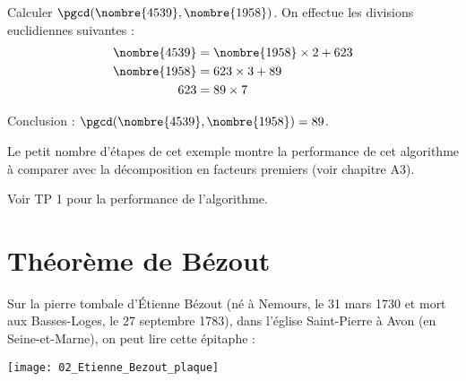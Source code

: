 \begin{methode*1}
\exercice
\label{methode-alg_euclide}
Calculer $\pgcd(\nombre{4539},\nombre{1958})$.
\correction
On effectue les divisions euclidiennes suivantes :\vspace{-5pt}
$$\begin{aligned}
\nombre{4539}&=\nombre{1958}\times2+623\\
\nombre{1958}&=623\times3+89\\
623&=89\times7
\end{aligned}\vspace{-5pt}$$

Conclusion : $\pgcd(\nombre{4539},\nombre{1958})=89$.
\end{methode*1}

\begin{remarque}
Le petit nombre d'étapes de cet exemple montre la performance de cet algorithme à comparer avec la décomposition en facteurs premiers (voir chapitre A3).

\algo Voir TP 1 pour la performance de l'algorithme.
\end{remarque}


\section{Théorème de Bézout}

\vspace{-5pt}
\parbox{0.7\textwidth}{%
  \begin{minipage}{0.6\textwidth} Sur la pierre tombale d’Étienne
    Bézout (né à Nemours, le 31 mars 1730 et mort aux Basses-Loges, le
    27 septembre 1783), dans l’église Saint-Pierre à
    Avon (en Seine-et-Marne), on peut lire cette épitaphe :

\begin{center}
\end{center}

\end{minipage}}
\parbox{0.2\textwidth}{\texttt{[image: 02\_Etienne\_Bezout\_plaque]}}


